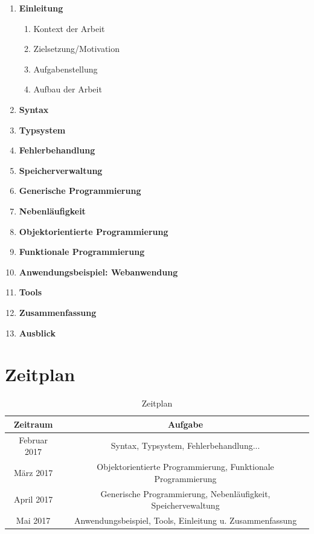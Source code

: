 \documentclass[
    paper=a4,
    bibtotocnumbered,
    liststotocnumbered,
    oneside,
    12pt,
    listof=totoc,
    toc=chapterentrywithdots,
    listof=entryprefix,
]{scrartcl}
\begin{document}
\begin{samepage}
\begin{enumerate}
    \item \textbf{Einleitung}
    \begin{enumerate}
        \item Kontext der Arbeit
        \item Zielsetzung/Motivation
        \item Aufgabenstellung
        \item Aufbau der Arbeit
    \end{enumerate}
    \item \textbf{Syntax}
    \item \textbf{Typsystem}
    \item \textbf{Fehlerbehandlung}
    \item \textbf{Speicherverwaltung}
    \item \textbf{Generische Programmierung}
    \item \textbf{Nebenläufigkeit}
    \item \textbf{Objektorientierte Programmierung}
    \item \textbf{Funktionale Programmierung}
    \item \textbf{Anwendungsbeispiel: Webanwendung}
    \item \textbf{Tools}
    \item \textbf{Zusammenfassung}
    \item \textbf{Ausblick}
\end{enumerate}
\end{samepage}

\section{Zeitplan}

\begin{table}[h]
\centering
\begin{tabular}{|c|c|} 
 \hline
 \rowcolor[gray]{0.75} \textbf{Zeitraum} & \textbf{Aufgabe} \\
 \hline
 Februar 2017 & Syntax, Typsystem, Fehlerbehandlung... \\ 
 \hline 
 März 2017 & Objektorientierte Programmierung, Funktionale Programmierung \\
 \hline 
 April 2017 & Generische Programmierung, Nebenläufigkeit, Speichervewaltung \\
 \hline
 Mai 2017 & Anwendungsbeispiel, Tools, Einleitung u. Zusammenfassung \\
 \hline
\end{tabular}
\caption{Zeitplan}
\label{table:zeitplan}
\end{table}
\end{document}
